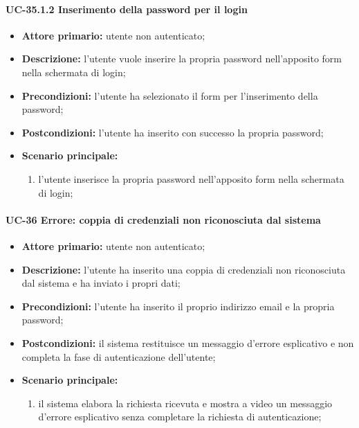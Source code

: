 \paragraph{UC-35.1.2 Inserimento della password per il login}

	\begin{itemize}
		\item \textbf{Attore primario:} utente non autenticato;

		\item \textbf{Descrizione:} l'utente vuole inserire la propria password nell'apposito form nella schermata di login;

		\item \textbf{Precondizioni:} l'utente ha selezionato il form per l'inserimento della password;

		\item \textbf{Postcondizioni:} l'utente ha inserito con successo la propria password;

		\item \textbf{Scenario principale:}
	  		\begin{enumerate}
			  \item l'utente inserisce la propria password nell'apposito form nella schermata di login; 
	  		\end{enumerate}
	\end{itemize}

\paragraph{UC-36 Errore: coppia di credenziali non riconosciuta dal sistema}

	\begin{itemize}
		\item \textbf{Attore primario:} utente non autenticato;

		\item \textbf{Descrizione:} l'utente ha inserito una coppia di credenziali non riconosciuta dal sistema e ha inviato i propri dati;

		\item \textbf{Precondizioni:} l'utente ha inserito il proprio indirizzo email e la propria password;

		\item \textbf{Postcondizioni:} il sistema restituisce un messaggio d'errore esplicativo e non completa la fase di autenticazione dell'utente;

		\item \textbf{Scenario principale:}
	  		\begin{enumerate}
		  		\item il sistema elabora la richiesta ricevuta e mostra a video un messaggio d'errore esplicativo senza completare la richiesta di autenticazione; 
	  		\end{enumerate}
	\end{itemize}

